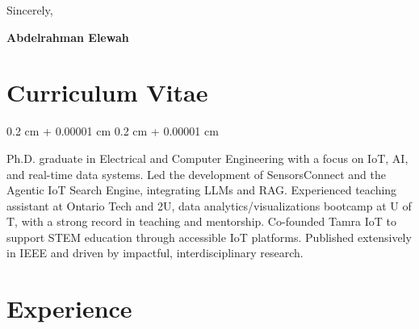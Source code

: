 \documentclass[10pt, letterpaper]{article}
\newenvironment{onecolentry}{
    \begin{adjustwidth}{
        0.2 cm + 0.00001 cm
    }{
        0.2 cm + 0.00001 cm
    }
}{
    \end{adjustwidth}
} %
\let\hrefWithoutArrow\href
\renewcommand{\href}[2]{\hrefWithoutArrow{#1}{\ifthenelse{\equal{#2}{}}{ }{#2 }\raisebox{.15ex}{\footnotesize \faExternalLink*}}}
\begin{document}
    Sincerely, \vspace{.2cm}
    
    \textbf{Abdelrahman Elewah}



    \section{Curriculum Vitae}



        
        \begin{onecolentry}
      Ph.D. graduate in Electrical and Computer Engineering with a focus on IoT, AI, and real-time data systems. Led the development of SensorsConnect and the Agentic IoT Search Engine, integrating LLMs and RAG. Experienced teaching assistant at Ontario Tech and 2U, data analytics/visualizations bootcamp at U of T, with a strong record in teaching and mentorship. Co-founded Tamra IoT to support STEM education through accessible IoT platforms. Published extensively in IEEE and driven by impactful, interdisciplinary research.
        \end{onecolentry}

       


\section{Experience}



        
      
\end{document}
